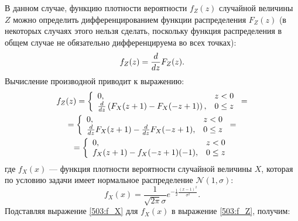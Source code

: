 В данном случае, функцию плотности вероятности $f_Z(z)$ случайной величины $Z$ можно определить дифференцированием функции распределения $F_Z(z)$ (в некоторых случаях этого
нельзя сделать, поскольку функция распределения в общем случае не обязательно дифференцируема во всех точках):
\begin{equation}
    f_Z(z) = \frac{d}{dz} F_Z(z) .
\end{equation}
Вычисление производной приводит к выражению:
\begin{multline}
    \label{503:f_Z}
    f_Z(z)
    = \left \{
    \begin{array}{ll}
        0,                                                        & z < 0    \\
        \frac{d}{dz} \left ( F_X(z + 1) - F_X(-z + 1) \right ), & 0 \leq z
    \end{array}
    \right . = \\
    = \left \{
    \begin{array}{ll}
        0,                                                      & z < 0    \\
        \frac{d}{dz} F_X(z + 1) - \frac{d}{dz} F_X(-z + 1), & 0 \leq z
    \end{array}
    \right . = \\
    = \left \{
    \begin{array}{ll}
        0,                            & z < 0    \\
        f_X(z + 1) - f_X(-z + 1)(-1), & 0 \leq z
    \end{array}
    \right .
\end{multline}
где $f_X(x)$ --- функция плотности вероятности случайной величины $X$, которая по условию задачи имеет нормальное распределение $\mathcal{N}(1,\sigma)$:
\begin{equation}
    \label{503:f_X}
    f_X(x) = \frac{1}{\sqrt{2 \pi} \sigma} e^{-\frac{1}{2} \frac{\left ( x - 1 \right )^2}{\sigma^2}} .
\end{equation}
Подставляя выражение \eqref{503:f_X} для $f_X(x)$ в выражение \eqref{503:f_Z}, получим:
